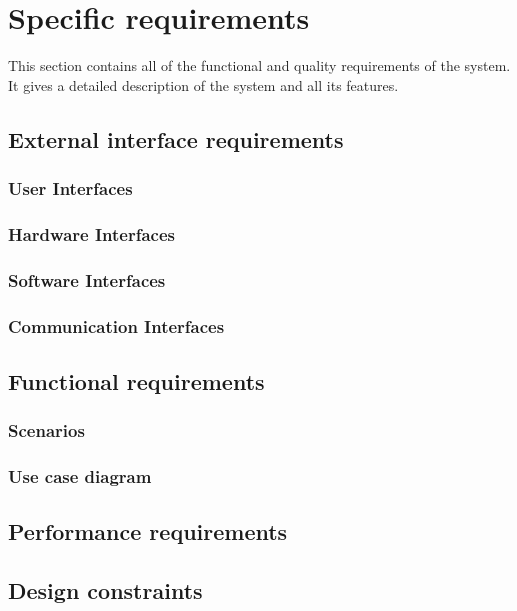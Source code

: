 \documentclass[a4paper, hidelinks, 12pt]{report}
\begin{document}
    \chapter{Specific requirements}\label{ch:specific-requirements}
    This section contains all of the functional and quality requirements of the system. It gives a detailed description of the system and all its features.
    \section{External interface requirements}\label{sec:external-interface-requirements}
        \subsection{User Interfaces}\label{subsec:user-interfaces}
        \subsection{Hardware Interfaces}\label{subsec:hardware-interfaces}
        \subsection{Software Interfaces}\label{subsec:software-interfaces}
        \subsection{Communication Interfaces}\label{subsec:communication-interface}
    \section{Functional requirements}\label{sec:functional-requirements}
        \subsection{Scenarios}\label{subsec:scenarios}
        \subsection{Use case diagram}\label{subsec:Use-case-diagram}
    \section{Performance requirements}\label{sec:performance-requirements}
    \section{Design constraints}\label{sec:design-constraints}
\end{document}
